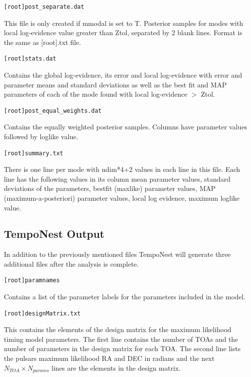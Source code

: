 \documentclass[%
 preprint,
 amsmath,amssymb,amsfonts,
 aps,
]{revtex4-1}
\begin{document}
\begin{lstlisting}
[root]post_separate.dat
\end{lstlisting}
This file is only created if mmodal is set to T. Posterior samples for modes with local log-evidence value
greater than Ztol, separated by 2 blank lines. Format is the same as [root].txt file.

\begin{lstlisting}
[root]stats.dat
\end{lstlisting}
Contains the global log-evidence, its error and local log-evidence with error and parameter means and standard
deviations as well as the  best fit and MAP parameters of each of the mode found with local log-evidence $>$ Ztol.

\begin{lstlisting}
[root]post_equal_weights.dat
\end{lstlisting}
Contains the equally weighted posterior samples. Columns have parameter values followed by loglike value.

\begin{lstlisting}
[root]summary.txt
\end{lstlisting}
There is one line per mode with ndim*4+2 values in each line in this file. Each line has the following values 
in its column mean parameter values, standard deviations of the parameters, bestfit (maxlike) parameter values, 
MAP (maximum-a-posteriori) parameter values, local log evidence, maximum loglike value.

\subsection{TempoNest Output}

In addition to the previously mentioned files TempoNest will generate three additional files after the analysis is complete.

\begin{lstlisting}
[root]paramnames
\end{lstlisting}
Contains a list of the parameter labels for the parameters included in the model.

\begin{lstlisting}
[root]designMatrix.txt
\end{lstlisting}
This contains the elements of the design matrix for the maximum likelihood timing model parameters.  The first line contains the number of TOAs and the number of parameters in the design matrix for each TOA.  The second line lists the pulsars maximum likelihood RA and DEC in radians and the next $N_{TOA} \times N_{params}$ lines are the elements in the design matrix.
\end{document}
